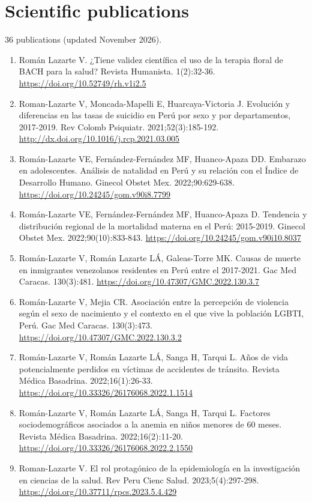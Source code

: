 \documentclass[11pt,a4paper]{article}
\begin{document}
\section*{Scientific publications}
36 publications (updated November 2026).
\begin{enumerate}[leftmargin=*]
\item Román Lazarte V. ¿Tiene validez científica el uso de la terapia floral de BACH para la salud? Revista Humanista. 1(2):32-36. \url{https://doi.org/10.52749/rh.v1i2.5}
\item Roman-Lazarte V, Moncada-Mapelli E, Huarcaya-Victoria J. Evolución y diferencias en las tasas de suicidio en Perú por sexo y por departamentos, 2017-2019. Rev Colomb Psiquiatr. 2021;52(3):185-192. \url{http://dx.doi.org/10.1016/j.rcp.2021.03.005}
\item Román-Lazarte VE, Fernández-Fernández MF, Huanco-Apaza DD. Embarazo en adolescentes. Análisis de natalidad en Perú y su relación con el Índice de Desarrollo Humano. Ginecol Obstet Mex. 2022;90:629-638. \url{https://doi.org/10.24245/gom.v90i8.7799}
\item Román-Lazarte VE, Fernández-Fernández MF, Huanco-Apaza D. Tendencia y distribución regional de la mortalidad materna en el Perú: 2015-2019. Ginecol Obstet Mex. 2022;90(10):833-843. \url{https://doi.org/10.24245/gom.v90i10.8037}
\item Román-Lazarte V, Román Lazarte LÁ, Galeas-Torre MK. Causas de muerte en inmigrantes venezolanos residentes en Perú entre el 2017-2021. Gac Med Caracas. 130(3):481. \url{https://doi.org/10.47307/GMC.2022.130.3.7}
\item Román-Lazarte V, Mejia CR. Asociación entre la percepción de violencia según el sexo de nacimiento y el contexto en el que vive la población LGBTI, Perú. Gac Med Caracas. 130(3):473. \url{https://doi.org/10.47307/GMC.2022.130.3.2}
\item Román-Lazarte V, Román Lazarte LÁ, Sanga H, Tarqui L. Años de vida potencialmente perdidos en víctimas de accidentes de tránsito. Revista Médica Basadrina. 2022;16(1):26-33. \url{https://doi.org/10.33326/26176068.2022.1.1514}
\item Román-Lazarte V, Román Lazarte LÁ, Sanga H, Tarqui L. Factores sociodemográficos asociados a la anemia en niños menores de 60 meses. Revista Médica Basadrina. 2022;16(2):11-20. \url{https://doi.org/10.33326/26176068.2022.2.1550}
\item Roman-Lazarte V. El rol protagónico de la epidemiología en la investigación en ciencias de la salud. Rev Peru Cienc Salud. 2023;5(4):297-298. \url{https://doi.org/10.37711/rpcs.2023.5.4.429}

\end{enumerate}
\end{document}
